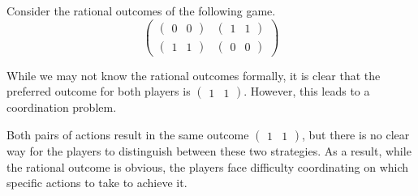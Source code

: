 \begin{example}
    Consider the rational outcomes of the following game. 
    \[\begin{pmatrix} \begin{pmatrix} 0 & 0 \end{pmatrix} & \begin{pmatrix} 1 & 1 \end{pmatrix} \\ \begin{pmatrix} 1 & 1 \end{pmatrix} & \begin{pmatrix} 0 & 0 \end{pmatrix} \end{pmatrix}\]

    While we may not know the rational outcomes formally, it is clear that the preferred outcome for both players is $\begin{pmatrix} 1 & 1 \end{pmatrix}$. 
    However, this leads to a coordination problem.

    Both pairs of actions result in the same outcome $\begin{pmatrix} 1 & 1 \end{pmatrix}$, but there is no clear way for the players to distinguish between these two strategies.
    As a result, while the rational outcome is obvious, the players face difficulty coordinating on which specific actions to take to achieve it.
\end{example}

